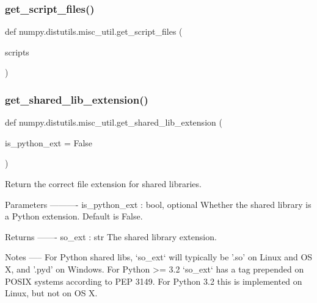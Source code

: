 \subsubsection{\texorpdfstring{get\+\_\+script\+\_\+files()}{get\_script\_files()}}
{\footnotesize\ttfamily def numpy.\+distutils.\+misc\+\_\+util.\+get\+\_\+script\+\_\+files (\begin{DoxyParamCaption}\item[{}]{scripts }\end{DoxyParamCaption})}

\mbox{\label{namespacenumpy_1_1distutils_1_1misc__util_a77216d888bf3769ce65633d4d253a3ee}} 
\subsubsection{\texorpdfstring{get\+\_\+shared\+\_\+lib\+\_\+extension()}{get\_shared\_lib\_extension()}}
{\footnotesize\ttfamily def numpy.\+distutils.\+misc\+\_\+util.\+get\+\_\+shared\+\_\+lib\+\_\+extension (\begin{DoxyParamCaption}\item[{}]{is\+\_\+python\+\_\+ext = {\ttfamily False} }\end{DoxyParamCaption})}

\begin{DoxyVerb}Return the correct file extension for shared libraries.

Parameters
----------
is_python_ext : bool, optional
    Whether the shared library is a Python extension.  Default is False.

Returns
-------
so_ext : str
    The shared library extension.

Notes
-----
For Python shared libs, `so_ext` will typically be '.so' on Linux and OS X,
and '.pyd' on Windows.  For Python >= 3.2 `so_ext` has a tag prepended on
POSIX systems according to PEP 3149.  For Python 3.2 this is implemented on
Linux, but not on OS X.\end{DoxyVerb}
 \mbox{\label{namespacenumpy_1_1distutils_1_1misc__util_aa9bd57a8ec6fdbfb570c903aa651868d}} 
